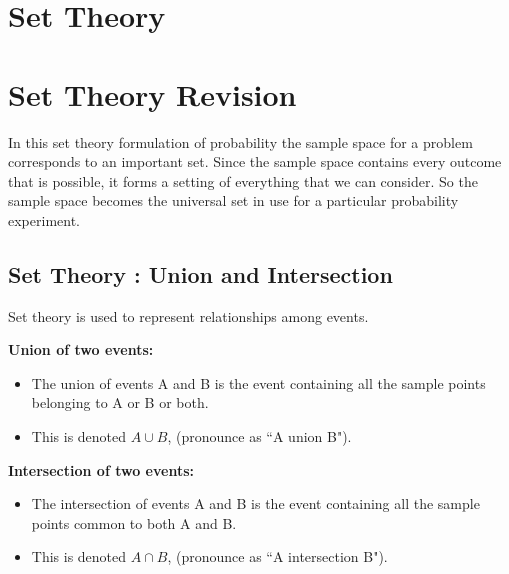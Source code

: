 \documentclass[]{report}
\begin{document}
\section{Set Theory}
\section{Set Theory Revision}
		In this set theory formulation of probability the sample space for a problem corresponds to an important set. Since the sample space contains every outcome that is possible, it forms a setting of everything that we can consider. So the sample space becomes the universal set in use for a particular probability experiment.
		

			\subsection{Set Theory : Union and Intersection}
			

		
		Set theory is used to represent relationships among events.\\ \bigskip
		
		\noindent \textbf{Union of two events:}
		\begin{itemize}
			\item The union of events A and B is the event containing all the sample points
			belonging to A or B or both. 
			\item This is denoted $A\cup B$, (pronounce as ``A union
			B").\end{itemize} \bigskip
		\noindent \textbf{Intersection of two events:}\\
		\begin{itemize}
			\item 
			The intersection of events A and B is the event containing all the sample
			points common to both A and B.
			\item This is denoted $A\cap B$, (pronounce as ``A intersection
			B").
		\end{itemize}
	
	
\end{document}
